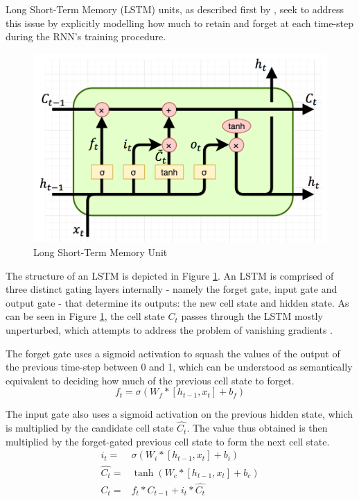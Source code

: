 Long Short-Term Memory (LSTM) units, as described first by \cite{hochreiter1997long}, seek to address this issue by explicitly modelling how much to retain and forget at each time-step during the RNN's training procedure.

\begin{figure}[ht]
	\centering
	\includegraphics[width=\textwidth]{images/lstm}
	\caption{\label{fig:lstm} Long Short-Term Memory Unit}
\end{figure}

The structure of an LSTM is depicted in Figure \ref{fig:lstm}. An LSTM is comprised of three distinct gating layers internally - namely the forget gate, input gate and output gate - that determine its outputs: the new cell state and hidden state. As can be seen in Figure \ref{fig:lstm}, the cell state $C_t$ passes through the LSTM mostly unperturbed, which attempts to address the problem of vanishing gradients \citep{hochreiter1999vanishing}.

The forget gate uses a sigmoid activation to squash the values of the output of the previous time-step between 0 and 1, which can be understood as semantically equivalent to deciding how much of the previous cell state to forget.
\begin{equation*}
	f_t = \sigma(W_f*[h_{t-1}, x_t] + b_f)
\end{equation*}

The input gate also uses a sigmoid activation on the previous hidden state, which is multiplied by the candidate cell state $\hat{C_t}$. The value thus obtained is then multiplied by the forget-gated previous cell state to form the next cell state.
\begin{align*}
	i_t =
	 & \sigma(W_i*[h_{t-1}, x_t] + b_i) \\
	\hat{C_t} =
	 & \tanh(W_c*[h_{t-1}, x_t] + b_c)  \\
	C_t =
	 & f_t * C_{t-1} + i_t * \hat{C_t}
\end{align*}

